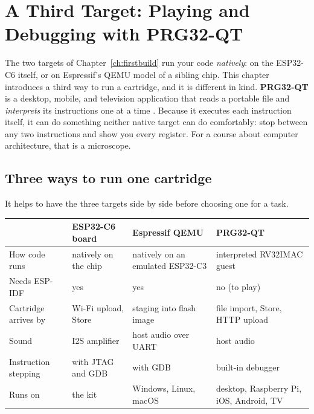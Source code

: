 \chapter{A Third Target: Playing and Debugging with PRG32-QT}
\label{ch:qt}

The two targets of Chapter~\ref{ch:firstbuild} run your code \emph{natively}: on
the ESP32\nobreakdash-C6 itself, or on Espressif's QEMU model of a sibling chip.
This chapter introduces a third way to run a cartridge, and it is different in
kind. \textbf{PRG32-QT} is a desktop, mobile, and television application that
reads a portable  file and \emph{interprets} its \riscv
instructions one at a time \citep{prg32qt}. Because it executes each instruction
itself, it can do something neither native target can do comfortably: stop
between any two instructions and show you every register. For a course about
computer architecture, that is a microscope.

\section{Three ways to run one cartridge}

It helps to have the three targets side by side before choosing one for a task.

\begin{center}
\begin{tabularx}{\linewidth}{@{}lXXX@{}}
\toprule
 & ESP32-C6 board & Espressif QEMU & PRG32-QT \\
\midrule
How code runs & natively on the chip & natively on an emulated ESP32-C3 &
  interpreted RV32IMAC guest \\
Needs ESP-IDF & yes & yes & no (to play) \\
Cartridge arrives by & Wi-Fi upload, Store & staging into flash image &
  file import, Store, HTTP upload \\
Sound & I2S amplifier & host audio over UART & host audio \\
Instruction stepping & with JTAG and GDB & with GDB & built-in debugger \\
Runs on & the kit & Windows, Linux, macOS & desktop, Raspberry Pi, iOS,
  Android, TV \\
\bottomrule
\end{tabularx}
\label{tab:threehosts}
\end{center}

